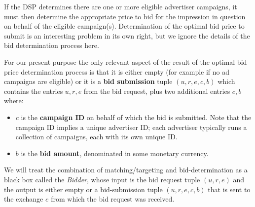 \documentclass[11pt,a4paper]{article}
\theoremstyle{definition}
\theoremstyle{remark}
\theoremstyle{definition}
\theoremstyle{definition}
\theoremstyle{definition}
\theoremstyle{definition}
\theoremstyle{definition}
\theoremstyle{definition}
\begin{document}
If the DSP determines there are one or more eligible advertiser campaigns, it must then determine the appropriate price to bid for the impression in question on behalf of the eligible campaign(s). Determination of the optimal bid price to submit is an interesting problem in its own right, but we ignore the details of the bid determination process here. 

For our present purpose the only relevant aspect of the result of the optimal bid price determination process is that it is either empty (for example if no ad campaigns are eligible) or it is a {\bf bid submission} tuple 
$(u,r,e,c,b)$ which contains the entries $u,r,e$ from the bid request, plus two additional entries $c,b$ where:
\begin{itemize}
	\item $c$ is the {\bf campaign ID} on behalf of which the bid is submitted. Note that the campaign ID implies a unique advertiser ID; each advertiser typically runs a collection of campaigns, each with its own unique ID. 
	\item $b$ is the {\bf bid amount}, denominated in some monetary currency.
\end{itemize}

We will treat the combination of matching/targeting and bid-determination as a black box called the {\em Bidder}, whose input is the bid request tuple 
$(u,r,e)$ and the output is either empty or a bid-submission tuple  
$(u,r,e,c,b)$ that is sent to the exchange $e$ from which the bid request was received. 
\end{document}
